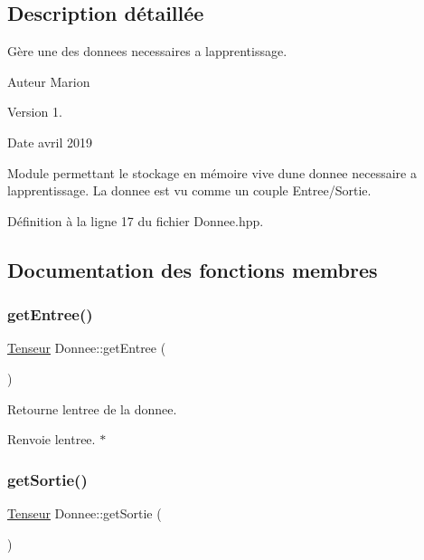 \subsection{Description détaillée}
Gère une des donnees necessaires a l\textquotesingle{}apprentissage. 

\begin{DoxyAuthor}{Auteur}
Marion 
\end{DoxyAuthor}
\begin{DoxyVersion}{Version}
1. 
\end{DoxyVersion}
\begin{DoxyDate}{Date}
avril 2019
\end{DoxyDate}
Module permettant le stockage en mémoire vive d\textquotesingle{}une donnee necessaire a l\textquotesingle{}apprentissage. La donnee est vu comme un couple Entree/\+Sortie. 

Définition à la ligne 17 du fichier Donnee.\+hpp.



\subsection{Documentation des fonctions membres}
\mbox{\label{class_donnee_af4b02bb80cd289073f1eb56fc9046c11}} 
\subsubsection{\texorpdfstring{get\+Entree()}{getEntree()}}
{\footnotesize\ttfamily \hyperlink{class_tenseur}{Tenseur} Donnee\+::get\+Entree (\begin{DoxyParamCaption}{ }\end{DoxyParamCaption})}



Retourne l\textquotesingle{}entree de la donnee. 

\begin{DoxyReturn}{Renvoie}
l\textquotesingle{}entree. $\ast$ 
\end{DoxyReturn}
\mbox{\label{class_donnee_aadc9c0ab3f163fa6c0e57daa57023de0}} 
\subsubsection{\texorpdfstring{get\+Sortie()}{getSortie()}}
{\footnotesize\ttfamily \hyperlink{class_tenseur}{Tenseur} Donnee\+::get\+Sortie (\begin{DoxyParamCaption}{ }\end{DoxyParamCaption})}



